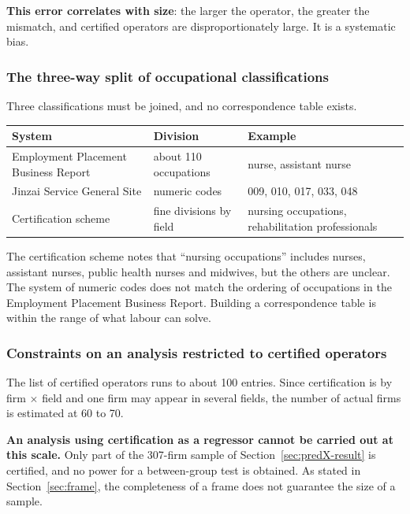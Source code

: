\textbf{This error correlates with size}: the larger the operator, the greater the mismatch, and
certified operators are disproportionately large. It is a systematic bias.

\subsubsection{The three-way split of occupational classifications}

Three classifications must be joined, and no correspondence table exists.

\begin{center}
\begin{tabularx}{\textwidth}{@{}llX@{}}
\toprule
System & Division & Example \\
\midrule
Employment Placement Business Report & about 110 occupations & nurse, assistant nurse \\
Jinzai Service General Site & numeric codes & 009, 010, 017, 033, 048 \\
Certification scheme & fine divisions by field & nursing occupations, rehabilitation professionals \\
\bottomrule
\end{tabularx}
\label{tab:occupation-classification-systems}
\end{center}

The certification scheme notes that ``nursing occupations'' includes nurses, assistant nurses,
public health nurses and midwives, but the others are unclear. The system of numeric codes does
not match the ordering of occupations in the Employment Placement Business Report. Building a
correspondence table is within the range of what labour can solve.

\subsubsection{Constraints on an analysis restricted to certified operators}
\label{sec:nintei-small}

The list of certified operators runs to about 100 entries. Since certification is by firm
$\times$ field and one firm may appear in several fields, the number of actual firms is estimated
at 60 to 70.

\textbf{An analysis using certification as a regressor cannot be carried out at this scale.} Only
part of the 307-firm sample of Section~\ref{sec:predX-result} is certified, and no power for a
between-group test is obtained. As stated in Section~\ref{sec:frame}, the completeness of a frame
does not guarantee the size of a sample.

